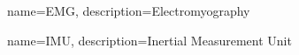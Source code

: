  
{
        name=EMG,
        description={Electromyography}
}

{
        name=IMU,
        description={Inertial Measurement Unit}
}
